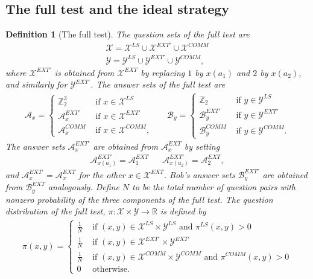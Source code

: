 \documentclass[11pt,letterpaper]{article}
\newcommand{\R}{\mathbb{R}}
\newcommand{\Z}{\mathbb{Z}}
\newcommand{\calX}{\mathcal{X}}
\newcommand{\calY}{\mathcal{Y}}
\newcommand{\calA}{\mathcal{A}}
\newcommand{\calB}{\mathcal{B}}
\newcommand{\1}{\mathbb{1}}
\newcommand{\EXT}{EXT}
\newcommand{\LS}{LS}
\newcommand{\COMM}{COMM}
\newtheorem{definition}[theorem]{Definition}
\theoremstyle{definition}
\begin{document}
\subsection{The full test and the ideal strategy}
\label{sec:ideal_strat}
\begin{definition}[The full test]
The question sets of the full test are
\begin{align*}
    \calX = \calX^{\LS} \cup \calX^{\EXT'} \cup \calX^{\COMM} \\
    \calY = \calY^{\LS} \cup \calY^{\EXT'} \cup \calY^{\COMM},
\end{align*}
where $\calX^{\EXT'}$ is obtained from $\calX^{\EXT}$ by replacing 
$1$ by $x(a_1)$ and $2$ by $x(a_2)$, and similarly for $\calY^{\EXT'}$.
The answer sets of the full test are
\begin{align*}
    \calA_x = 
    \begin{cases}
    \Z_2^3 &\text{ if } x \in \calX^{\LS} \\
    \calA_x^{\EXT'} &\text{ if } x \in \calX^{\EXT'} \\
    \calA_x^{\COMM} & \text{ if } x \in \calX^{\COMM},
    \end{cases}
    &&
    \calB_y = 
    \begin{cases}
    \Z_2 &\text{ if } y \in \calY^{\LS} \\
    \calB_y^{\EXT'} &\text{ if } y \in \calY^{\EXT'} \\
    \calB_y^{\COMM} & \text{ if } y \in \calY^{\COMM}.
    \end{cases}
\end{align*}
The answer sets $\calA_x^{\EXT'}$ are obtained from $\calA_x^{\EXT}$
by setting 
\begin{align*}
    \calA_{x(a_1)}^{\EXT'} =\calA_{1}^{\EXT} &&
    \calA_{x(a_2)}^{\EXT'} =\calA_{2}^{\EXT},
\end{align*}
and $\calA_x^{\EXT'} = \calA_x^{\EXT}$ for the other $x \in \calX^{\EXT}$.
Bob's answer sets $\calB_y^{\EXT'}$ are obtained from $\calB_y^{\EXT}$
analogously.
Define $N$ to be the total number of question pairs with nonzero probability 
of the three components of the full test.
The question distribution of the full test, $\pi: \calX \times \calY \rightarrow \R$ is defined by
\begin{align*}
    \pi(x,y) = \begin{cases}
    \frac{1}{N} & \text{ if } (x,y) \in \calX^{\LS} \times \calY^{\LS}
    \text{ and } \pi^{\LS}(x,y) > 0 \\
    \frac{1}{N} & \text{ if } (x,y) \in \calX^{\EXT'} \times \calY^{\EXT'}\\
    \frac{1}{N} & \text{ if } (x,y) \in \calX^{\COMM} \times \calY^{\COMM} \text{ and } \pi^{\COMM}(x,y) > 0 \\
    0 & \text{ otherwise}.
    \end{cases}
\end{align*}
\end{definition}
\end{document}
